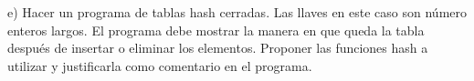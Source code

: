 {\color[rgb]{1,0,0}
e) Hacer un programa de tablas hash cerradas. Las llaves
en este caso son número enteros largos. El programa debe
mostrar la manera en que queda la tabla después de insertar
o eliminar los elementos. Proponer las funciones hash a
utilizar y justificarla como comentario en el programa.
}